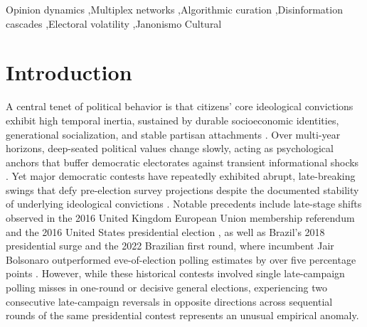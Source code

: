 \documentclass[a4paper,fleqn]{cas-dc}
\begin{document}
\begin{keywords}
Opinion dynamics \sep Multiplex networks \sep Algorithmic curation \sep Disinformation cascades \sep Electoral volatility \sep Janonismo Cultural
\end{keywords}

\maketitle

\section{Introduction}
\label{sec:intro}

A central tenet of political behavior is that citizens' core ideological convictions exhibit high temporal inertia, sustained by durable socioeconomic identities, generational socialization, and stable partisan attachments \citep{converse1964nature, alwin1991aging, zaller1992nature}. Over multi-year horizons, deep-seated political values change slowly, acting as psychological anchors that buffer democratic electorates against transient informational shocks \citep{kiley2020measuring, howe2017attitude}. Yet major democratic contests have repeatedly exhibited abrupt, late-breaking swings that defy pre-election survey projections despite the documented stability of underlying ideological convictions \citep{tucker2018social, lorenz2019accelerating, jennings2018election}. Notable precedents include late-stage shifts observed in the 2016 United Kingdom European Union membership referendum and the 2016 United States presidential election \citep{kennedy2018evaluation, jennings2018election}, as well as Brazil's 2018 presidential surge \citep{nicolau2020brasil} and the 2022 Brazilian first round, where incumbent Jair Bolsonaro outperformed eve-of-election polling estimates by over five percentage points \citep{tse2022resultados}. However, while these historical contests involved single late-campaign polling misses in one-round or decisive general elections, experiencing two consecutive late-campaign reversals in opposite directions across sequential rounds of the same presidential contest represents an unusual empirical anomaly.
\end{document}
